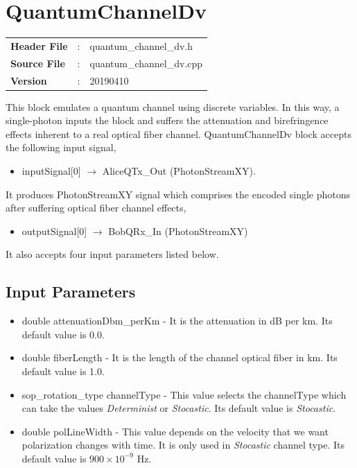 \clearpage

\section{QuantumChannelDv}

\begin{tcolorbox}	
\begin{tabular}{p{2.75cm} p{0.2cm} p{10.5cm}} 	
\textbf{Header File}   &:& quantum\_channel\_dv.h \\
\textbf{Source File}   &:& quantum\_channel\_dv.cpp \\
\textbf{Version}       &:& 20190410
\end{tabular}
\end{tcolorbox}

\maketitle
This block emulates a quantum channel using discrete variables. In this way, a single-photon inputs the block and suffers the attenuation and birefringence effects inherent to a real optical fiber channel. QuantumChannelDv block accepts the following input signal,

\begin{itemize}
  \item inputSignal[0] $\rightarrow$ AliceQTx\_Out (PhotonStreamXY).

\end{itemize}
It produces PhotonStreamXY signal which comprises the encoded single photons after suffering optical fiber channel effects,
\begin{itemize}
  \item outputSignal[0] $\rightarrow$ BobQRx\_In (PhotonStreamXY)
\end{itemize}

It also accepts four input parameters listed below.

\subsection*{Input Parameters}

	\begin{itemize}
        \item double attenuationDbm\_perKm - It is the attenuation in dB per km. Its default value is 0.0.

        \item double fiberLength - It is the length of the channel optical fiber in km. Its default value is 1.0.

		\item sop\_rotation\_type channelType - This value selects the channelType which can take the values \textit{Determinist} or \textit{Stocastic}. Its default value is \textit{Stocastic}.
	
		\item double polLineWidth - This value depends on the velocity that we want polarization changes with time. It is only used in \textit{Stocastic} channel type. Its default value is $900\times10^{-9}$ Hz.

	\end{itemize}

